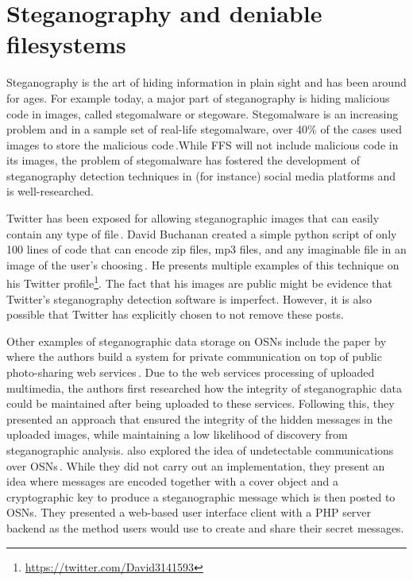 \section{Steganography and deniable filesystems}
\label{sec:SteganographyAndDeniableFS}
Steganography is the art of hiding information in plain sight and has been around for ages. For example today, a major part of steganography is hiding malicious code in images, called stegomalware or stegoware. Stegomalware is an increasing problem and in a sample set of \mbox{real-life} stegomalware, over 40\% of the cases used images to store the malicious code\,\cite{stichtingcuingfoundationSIMARGLStegwarePrimer2020}.While \gls{FFS} will not include malicious code in its images, the problem of stegomalware  has fostered the development of steganography detection techniques in (for instance) social media platforms and is \mbox{well-researched}. 

Twitter has been exposed for allowing steganographic images that can easily contain any type of file\,\cite{TwitterImagesCan}. David Buchanan created a simple python script of only \num{100} lines of code that can encode zip files, mp3 files, and any imaginable file in an image of the user's choosing\,\cite{buchananTweetablepolyglotpng2022}. He presents multiple examples of this technique on his Twitter profile\footnote{\url{https://twitter.com/David3141593}}. The fact that his images are public might be evidence that Twitter's steganography detection software is imperfect. However, it is also possible that Twitter has explicitly chosen to not remove these posts.

Other examples of steganographic data storage on \glspl{OSN} include the paper by \citeauthor{ningSecretMessageSharing2014} where the authors build a system for private communication on top of public \mbox{photo-sharing} web services\,\cite{ningSecretMessageSharing2014}. Due to the web services processing of uploaded multimedia, the authors first researched how the integrity of steganographic data could be maintained after being uploaded to these services. Following this, they presented an approach that ensured the integrity of the hidden messages in the uploaded images, while maintaining a low likelihood of discovery from steganographic analysis. \citeauthor{beatoUndetectableCommunicationOnline2014} also explored the idea of undetectable communications over \glspl{OSN}\,\cite{beatoUndetectableCommunicationOnline2014}. While they did not carry out an implementation, they present an idea where messages are encoded together with a cover object and a cryptographic key to produce a steganographic message which is then posted to \glspl{OSN}. They presented a \mbox{web-based} user interface client with a \gls{PHP} server backend as the method users would use to create and share their secret messages.

